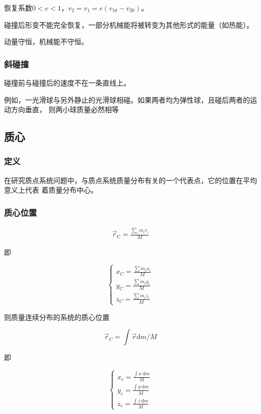\documentclass[
	12pt, %
	a4paper, %
]{myLegrandOrangeBook}
\newcommand{\rmd}{\mathrm{d}}
\begin{document}
恢复系数\(0<e<1\)，\(v_2=v_1=e\left(v_{10} - v_{20}\right)\)。

碰撞后形变不能完全恢复，一部分机械能将被转变为其他形式的能量（如热能）。

动量守恒，机械能不守恒。

\subsubsection*{斜碰撞}

碰撞前与碰撞后的速度不在一条直线上。

例如，一光滑球与另外静止的光滑球相碰。如果两者均为弹性球，且碰后两者的运动方向垂直，
则两小球质量必然相等

\subsection{质心}

\subsubsection*{定义}

在研究质点系统问题中，与质点系统质量分布有关的一个代表点，它的位置在平均意义上代表
着质量分布中心。

\subsubsection*{质心位置}

\begin{align}
    \overrightarrow{r}_{\mathrm{C}} = \frac{\sum_{i} m_ir_i}{M}
\end{align}

即

$$
    \left\{\begin{array}{l}
    x_C=\frac{\sum m_i x_i}{M} \\
    y_C=\frac{\sum m_i y_i}{M} \\
    z_C=\frac{\sum m_i z_i}{M}
    \end{array}\right.
$$

则质量连续分布的系统的质心位置

$$
    \overrightarrow{r}_C=\int \overrightarrow{r} \rmd m / M
$$

即

$$
    \left\{\begin{array}{l}
        x_c=\frac{\int x \mathrm{~d} m}{M} \\
        y_c=\frac{\int y \mathrm{~d} m}{M} \\
        z_c=\frac{\int z \mathrm{~d} m}{M}
    \end{array}\right.
$$
\end{document}
